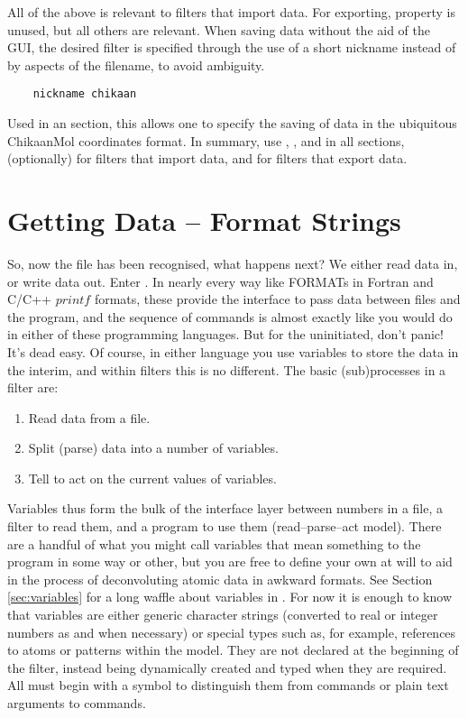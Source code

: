 All of the above is relevant to filters that import data. For exporting,  property is unused, but all others are relevant. When saving data without the aid of the GUI, the desired filter is specified through the use of a short nickname instead of by aspects of the filename, to avoid ambiguity.

\begin{verbatim}
	nickname chikaan
\end{verbatim}

Used in an  section, this allows one to specify the saving of data in the ubiquitous ChikaanMol coordinates format. In summary, use , , and  in all sections,  (optionally) for filters that import data, and  for filters that export data.

\section{Getting Data -- Format Strings}

So, now the file has been recognised, what happens next? We either read data in, or write data out. Enter . In nearly every way like FORMATs in Fortran and C/C++ $printf$ formats, these provide the interface to pass data between files and the program, and the sequence of commands is almost exactly like you would do in either of these programming languages. But for the uninitiated, don't panic! It's dead easy. Of course, in either language you use variables to store the data in the interim, and within filters this is no different. The basic (sub)processes in a filter are:

\begin{enumerate}
	\item Read data from a file.
	\item Split (parse) data into a number of variables.
	\item Tell \progname{} to act on the current values of variables.
\end{enumerate}

Variables thus form the bulk of the interface layer between numbers in a file, a filter to read them, and a program to use them (read--parse--act model). There are a handful of what you might call  variables that mean something to the program in some way or other, but you are free to define your own at will to aid in the process of deconvoluting atomic data in awkward formats. See Section \ref{sec:variables} for a long waffle about variables in \progname{}. For now it is enough to know that variables are either generic character strings (converted to real or integer numbers as and when necessary) or special types such as, for example, references to atoms or patterns within the model. They are not declared at the beginning of the filter, instead being dynamically created and typed when they are required. All must begin with a \qte{\$} symbol to distinguish them from commands or plain text arguments to commands.

